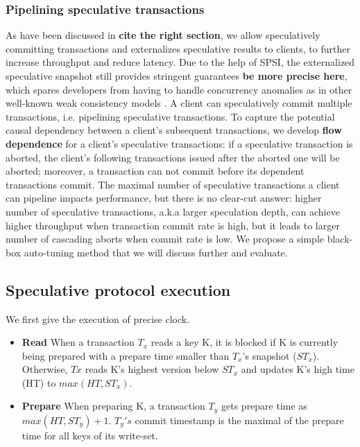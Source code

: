 \subsubsection{Pipelining speculative transactions}
As have been discussed in \textbf{cite the right section}, we allow speculatively committing transactions and externalizes speculative results to clients, to further increase throughput and reduce latency. Due to the help of SPSI, the externalized speculative snapshot still provides stringent guarantees \textbf{be more precise here}, which spares developers from having to handle concurrency anomalies as in other well-known weak consistency models \cite{cops, dynamo}. A client can speculatively commit multiple transactions, i.e. pipelining speculative transactions. To capture the potential causal dependency between a client's subsequent transactions, we develop \textbf{flow dependence} for a client's speculative transactions: if a speculative transaction is aborted, the client's following transactions issued after the aborted one will be aborted; moreover, a transaction can not commit before its dependent transactions commit. The maximal number of speculative transactions a client can pipeline impacts performance, but there is no clear-cut answer: higher number of speculative transactions, a.k.a larger speculation depth, can achieve higher throughput when transaction commit rate is high, but it leads to larger number of cascading aborts when commit rate is low. We propose a simple black-box auto-tuning method that we will discuss further and evaluate.

\subsection{Speculative protocol execution}
\label{subsec:execution}

We first give the execution of precise clock.
\begin{itemize}
\item \textbf{Read} When a transaction $T_x$ reads a key K, it is blocked if K is currently being prepared with a prepare time smaller than $T_x$'s snapshot ($ST_x$). Otherwise, $Tx$ reads K's highest version below $ST_x$ and updates K's high time (HT) to $max(HT, ST_x)$.
\item \textbf{Prepare} When preparing K, a transaction $T_y$ gets prepare time as $max(HT, ST_y)+1$. $T_y's$ commit timestamp is the maximal of the prepare time for all keys of its write-set.
\end{itemize}

